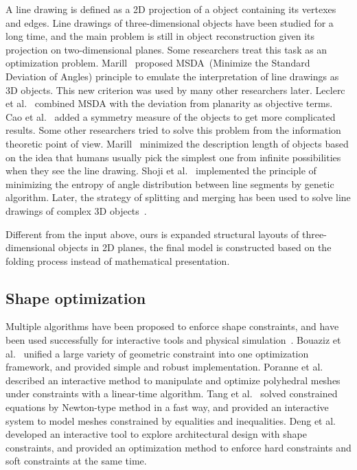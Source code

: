 A line drawing is defined as a 2D projection of a object containing its vertexes and edges. Line drawings of three-dimensional objects have been studied for a long time, and the main problem is still in object reconstruction given its projection on two-dimensional planes. 
Some researchers treat this task as an optimization problem. 
Marill~\cite{Marill:1991:EHI:113057.113061} proposed MSDA~(Minimize the Standard Deviation of Angles) principle to emulate the interpretation of line drawings as 3D objects. 
This new criterion was used by many other researchers later. 
Leclerc et al.~\cite{Leclerc1992An} combined MSDA with the deviation from planarity as objective terms. 
Cao et al.~\cite{Cao:2005:ORS:1097114.1097658} added a symmetry measure of the objects to get more complicated results. 
Some other researchers tried to solve this problem from the information theoretic point of view. 
Marill~\cite{Marill1992Why} minimized the description length of objects based on the idea that humans usually pick the simplest one from infinite possibilities when they see the line drawing. 
Shoji et al.~\cite{Shoji20013} implemented the principle of minimizing the entropy of angle distribution between line segments by genetic algorithm. Later, the strategy of splitting and merging has been used to solve line drawings of complex 3D objects~\cite{10.1109/TPAMI.2010.49,10.1109/CVPR.2014.94}.   
		 
Different from the input above, ours is expanded structural layouts of three-dimensional objects in 2D planes, the final model is constructed based on the folding process instead of mathematical presentation.

\subsection{Shape optimization}
Multiple algorithms have been proposed to enforce shape constraints, and have been used successfully for interactive tools and physical simulation~\cite{Botsch:2006:PCP:1281957.1281959,Igarashi:2005:ASM:1186822.1073323}. 
Bouaziz et al.~\cite{Bouaziz:2012:SSD:2346796.2346802} unified a large variety of geometric constraint into one optimization framework, and provided simple and robust implementation. 
Poranne et al.~\cite{Poranne2013Interactive} described an interactive method to manipulate and optimize polyhedral meshes under constraints with a linear-time algorithm. 
Tang et al.~\cite{Tang:2014:FPM:2601097.2601213} solved constrained equations by Newton-type method in a fast way, and provided an interactive system to model meshes constrained by equalities and inequalities. 
Deng et al.~\cite{Deng2015} developed an interactive tool to explore architectural design with shape constraints, and provided an optimization method to enforce hard constraints and soft constraints at the same time. 

